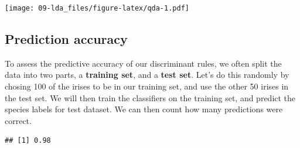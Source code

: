 \documentclass[
]{book}
\newenvironment{Shaded}{\begin{snugshade}}{\end{snugshade}}
\newcommand{\AttributeTok}[1]{\textcolor[rgb]{0.13,0.29,0.53}{#1}}
\newcommand{\DecValTok}[1]{\textcolor[rgb]{0.00,0.00,0.81}{#1}}
\newcommand{\FunctionTok}[1]{\textcolor[rgb]{0.13,0.29,0.53}{\textbf{#1}}}
\newcommand{\NormalTok}[1]{#1}
\newcommand{\OtherTok}[1]{\textcolor[rgb]{0.56,0.35,0.01}{#1}}
\newcommand{\SpecialCharTok}[1]{\textcolor[rgb]{0.81,0.36,0.00}{\textbf{#1}}}
\theoremstyle{definition}
\theoremstyle{definition}
\theoremstyle{definition}
\theoremstyle{definition}
\theoremstyle{remark}
\begin{document}
\texttt{[image: 09-lda\_files/figure-latex/qda-1.pdf]}

\subsection{Prediction accuracy}\label{prediction-accuracy}

To assess the predictive accuracy of our discriminant rules, we often split the data into two parts, a \textbf{training set}, and a \textbf{test set}. Let's do this randomly by chosing 100 of the irises to be in our training set, and use the other 50 irises in the test set. We will then train the classifiers on the training set, and predict the species labels for test dataset. We can then count how many predictions were correct.

\begin{Shaded}
\end{Shaded}

\begin{verbatim}
## [1] 0.98
\end{verbatim}

\begin{Shaded}
\end{Shaded}
\end{document}
